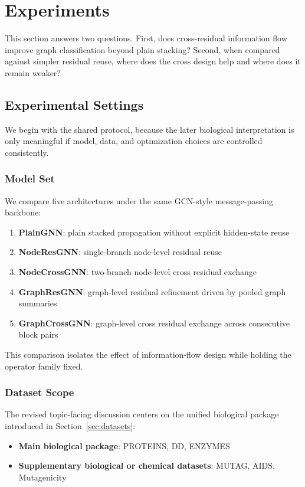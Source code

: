 \section{Experiments}
\label{sec:experiments}

This section answers two questions. First, does cross-residual information flow improve graph classification beyond plain stacking? Second, when compared against simpler residual reuse, where does the cross design help and where does it remain weaker?

\subsection{Experimental Settings}

We begin with the shared protocol, because the later biological interpretation is only meaningful if model, data, and optimization choices are controlled consistently.

\subsubsection{Model Set}

We compare five architectures under the same GCN-style message-passing backbone:
\begin{enumerate}
    \item \textbf{PlainGNN}: plain stacked propagation without explicit hidden-state reuse
    \item \textbf{NodeResGNN}: single-branch node-level residual reuse
    \item \textbf{NodeCrossGNN}: two-branch node-level cross residual exchange
    \item \textbf{GraphResGNN}: graph-level residual refinement driven by pooled graph summaries
    \item \textbf{GraphCrossGNN}: graph-level cross residual exchange across consecutive block pairs
\end{enumerate}

This comparison isolates the effect of information-flow design while holding the operator family fixed.

\subsubsection{Dataset Scope}

The revised topic-facing discussion centers on the unified biological package introduced in Section~\ref{sec:datasets}:
\begin{itemize}
    \item \textbf{Main biological package}: PROTEINS, DD, ENZYMES
    \item \textbf{Supplementary biological or chemical datasets}: MUTAG, AIDS, Mutagenicity
\end{itemize}

